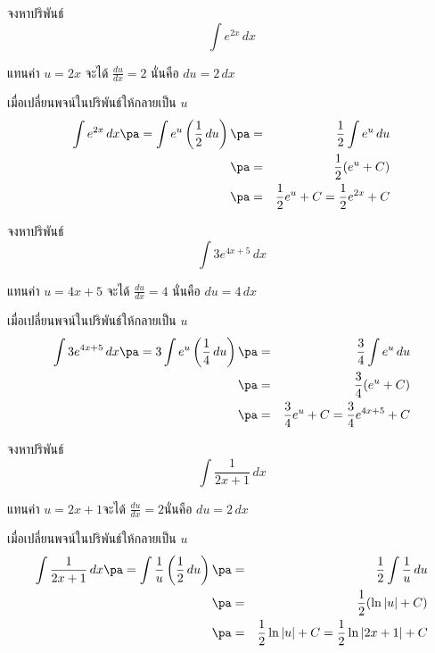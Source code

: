 \begin{frame}[t]
\begin{ex}
จงหาปริพันธ์
\[\int e^{2x} \,dx\]
\end{ex}
\begin{sol}
แทนค่า $u = 2x$ จะได้ $\frac{du}{dx} = 2$ นั่นคือ $du = 2\, dx$ \pa

เมื่อเปลี่ยนพจน์ในปริพันธ์ให้กลายเป็น $u$ \pa
\begin{eqnarray*}
\int e^{2x} \, dx \pa = \int e^u \left( \frac{1}{2} \, du \right) \pa &=& \frac{1}{2} \int e^u \, du \\
\pa &=& \frac{1}{2} (e^u + C) \\
\pa &=& \frac{1}{2} e^u + C = \frac{1}{2} e^{2x} + C
\end{eqnarray*}
\end{sol}
\end{frame}


\begin{frame}[t]
\begin{ex}
จงหาปริพันธ์
\[\int 3e^{4x+5} \,dx\]
\end{ex}
\begin{sol}
แทนค่า $u = 4x+5$ จะได้ $\frac{du}{dx} = 4$ นั่นคือ $du = 4\, dx$ \pa

เมื่อเปลี่ยนพจน์ในปริพันธ์ให้กลายเป็น $u$ \pa
\begin{eqnarray*}
\int 3e^{4x+5} \, dx \pa = 3\int e^u \left( \frac{1}{4} \, du \right) \pa &=& \frac{3}{4} \int e^u \, du \\
\pa &=& \frac{3}{4} (e^u + C) \\
\pa &=& \frac{3}{4} e^u + C = \frac{3}{4} e^{4x+5} + C
\end{eqnarray*}
\end{sol}
\end{frame}

\begin{frame}[t]
\begin{ex}
จงหาปริพันธ์
\[\int \frac{1}{2x+1} \,dx\]
\end{ex}
\begin{sol}
แทนค่า $u = 2x+1$\pa จะได้ $\frac{du}{dx} = 2$\pa นั่นคือ $du = 2\, dx$ \pa

เมื่อเปลี่ยนพจน์ในปริพันธ์ให้กลายเป็น $u$ \pa
\begin{eqnarray*}
\int \frac{1}{2x+1} \, dx \pa = \int \frac{1}{u} \left( \frac{1}{2} \, du \right) \pa &=& \frac{1}{2} \int \frac{1}{u} \, du \\
\pa &=& \frac{1}{2} (\ln |u| + C) \\
\pa &=& \frac{1}{2} \ln |u| + C = \frac{1}{2} \ln|2x+1| + C
\end{eqnarray*}
\end{sol}
\end{frame}



